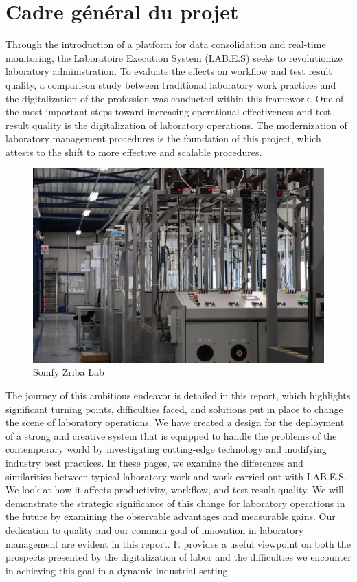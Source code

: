\section{Cadre général du projet}


Through the introduction of a platform for data consolidation and real-time monitoring, the Laboratoire Execution System (LAB.E.S) seeks to revolutionize laboratory administration.
To evaluate the effects on workflow and test result quality, a comparison study between traditional laboratory work practices and the digitalization of the profession was conducted within this framework.
One of the most important steps toward increasing operational effectiveness and test result quality is the digitalization of laboratory operations. The modernization of laboratory management procedures is the foundation of this project, which attests to the shift to more effective and scalable procedures.
\begin{figure}[H]
    \centering
    \includegraphics[width=1\textwidth]{chapters/1/img/IMG_0258.JPG}
    \caption{Somfy Zriba Lab}
    \label{fig:campus}
\end{figure}
The journey of this ambitious endeavor is detailed in this report, which highlights significant turning points, difficulties faced, and solutions put in place to change the scene of laboratory operations. 
We have created a design for the deployment of a strong and creative system that is equipped to handle the problems of the contemporary world by investigating cutting-edge technology and modifying industry best practices.
In these pages, we examine the differences and similarities between typical laboratory work and work carried out with LAB.E.S. We look at how it affects productivity, workflow, and test result quality. We will demonstrate the strategic significance of this change for laboratory operations in the future by examining the observable advantages and measurable gains.
Our dedication to quality and our common goal of innovation in laboratory management are evident in this report. It provides a useful viewpoint on both the prospects presented by the digitalization of labor and the difficulties we encounter in achieving this goal in a dynamic industrial setting.









